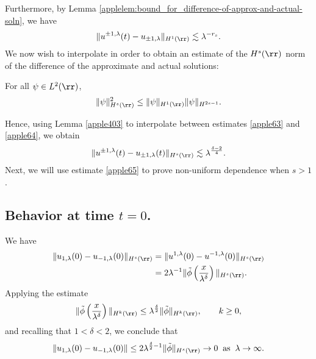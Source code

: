 Furthermore, by Lemma
\ref{applelem:bound_for_difference-of-approx-and-actual-soln}, we have
\begin{equation}
	\begin{split}
		\|u^{\pm 1, \lambda}(t) - u_{\pm 1, \lambda} \|_{H^1(\rr)} \lesssim
		\lambda^{-r_s}.
		\label{apple64}
	\end{split}
\end{equation}
		We now wish to interpolate in order to obtain an estimate of the $H^s (\rr)$
		norm of the difference of the approximate and actual solutions:
		\begin{lemma}
			\label{apple403}
			For all $\psi \in L^2(\rr)$,
			\begin{equation*}
				\|\psi \|_{H^s (\rr)}^2 \leq  \| \psi \|_{H^1 (\rr)} \| \psi
				\|_{H^{2s-1}}. 
			\end{equation*}
		\end{lemma}
			Hence, using Lemma \ref{apple403} to interpolate between estimates
			\eqref{apple63} and \eqref{apple64}, we obtain
			\begin{equation}
				\begin{split}
					\|u^{\pm 1, \lambda}(t) - u_{\pm 1, \lambda}(t)
					\|_{H^s(\rr)}
					\lesssim \lambda^{\frac{\delta -2}{4}}.
					\label{apple65}
				\end{split}
			\end{equation}
			Next, we will use estimate \eqref{apple65} to prove non-uniform
			dependence when $s > 1$.
%
\subsection{Behavior at time $t=0$.}  We have
%
%
\begin{equation}
	\begin{split}
		\|u_{1,\lambda}(0) - u_{-1,\lambda}(0) \|_{H^s(\rr)} 
		& = \|u^{1,\lambda}(0) - u^{-1,\lambda}(0) \|_{H^s(\rr)}
		\\
		& = 2 \lambda^{-1} \| \tilde{\phi}\left( \frac{x}{\lambda^\delta}
		\right) \|_{H^s(\rr)}.
		\label{apple}
	\end{split}
\end{equation}
Applying the estimate
\begin{equation}
	\begin{split}
		\|\tilde{\phi}\left( \frac{x}{\lambda^\delta}
		\right)\|_{H^{k}(\rr)} \le
		\lambda^{\frac{\delta}{2}}\|\tilde{\phi}\|_{H^{k}(\rr)},
		\qquad k\ge 0,
	\end{split}
\end{equation}
and recalling that $1<\delta<2$, we conclude that
\begin{equation}
	\begin{split}
		\|u_{1,\lambda}(0) - u_{-1,\lambda}(0) \| \le 2
		\lambda^{\frac{\delta}{2}-1} \|\tilde{\phi} \|_{H^s(\rr)} \to 0
		\; \; \text{as} \; \; \lambda \to \infty.
		\label{apple70}
	\end{split}
\end{equation}
%
%
%  
%
